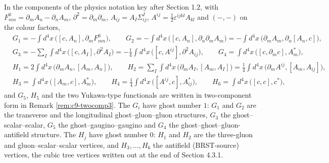 \begin{remark}
In the components of the physics notation key after Section 1.2, with $F^0_{mn}=\partial_mA_n-\partial_nA_m$, $\partial^2=\partial_m\partial_m$, $A_{ij}=A_I\Sigma^I_{ij}$, $A^{ij}=\tfrac12\varepsilon^{ijkl}A_{kl}$ and $(-,-)$ on the colour factors,
\[
\begin{aligned}
&G_1=-\int d^4x\,\big([c,A_n],\partial_mF^0_{mn}\big),\qquad G_2=-\int d^4x\,\big([c,A_n],\partial_n\partial_mA_m\big)=-\int d^4x\,\big(\partial_mA_m,\partial_n[A_n,c]\big),\\
&G_3=-\sum_I\int d^4x\,\big([c,A_I],\partial^2A_I\big)=-\tfrac14\int d^4x\,\big([c,A^{ij}],\partial^2A_{ij}\big),\qquad G_4=\int d^4x\,\big([c,\partial_mc],A^*_m\big),\\
&H_1=2\int d^4x\,\big(\partial_mA_n,[A_m,A_n]\big),\qquad H_2=\sum_I\int d^4x\,\big(\partial_mA_I,[A_m,A_I]\big)=\tfrac14\int d^4x\,\big(\partial_mA^{ij},[A_m,A_{ij}]\big),\\
&H_3=\int d^4x\,\big([A_m,c],A^*_m\big),\qquad H_4=\tfrac14\int d^4x\,\big([A^{ij},c],A^*_{ij}\big),\qquad H_6=\int d^4x\,\big([c,c],c^*\big),
\end{aligned}
\]
and $G_5$, $H_5$ and the two Yukawa-type functionals are written in two-component form in Remark \ref{rem:c9-twocomp3}. The $G_i$ have ghost number $1$: $G_1$ and $G_2$ are the transverse and the longitudinal ghost--gluon--gluon structures, $G_3$ the ghost--scalar--scalar, $G_5$ the ghost--gaugino--gaugino and $G_4$ the ghost--ghost--gluon-antifield structure. The $H_j$ have ghost number $0$: $H_1$ and $H_2$ are the three-gluon and gluon--scalar--scalar vertices, and $H_3,\dots,H_6$ the antifield (BRST-source) vertices, the cubic tree vertices written out at the end of Section 4.3.1.
\end{remark}

